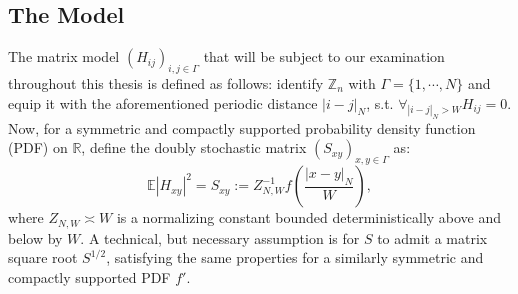\documentclass[11pt]{article}
\newcommand{\Z}{\mathbb{Z}}
\begin{document}
\subsection*{The Model}
\label{model}
The matrix model $(H_{ij})_{i, j\in \Gamma}$ that will be subject to our examination throughout this thesis is defined as follows: identify $\Z_n$ with $\Gamma=\{1, \cdots, N\}$ and equip it with the aforementioned periodic distance $|i-j|_N$, s.t. $\forall_{|i-j|_N>W} H_{ij}=0$. Now, for a symmetric and compactly supported probability density function (PDF) on $\mathbb{R}$, define the doubly stochastic matrix $(S_{xy})_{x, y\in \Gamma}$ as: $$\mathbb{E}|H_{xy}|^2=S_{xy} := Z_{N, W}^{-1}f\left(\frac{|x-y|_N}{W}\right),$$
where $Z_{N, W}\asymp W$ is a normalizing constant bounded deterministically above and below by $W$. A technical, but necessary assumption is for $S$ to admit a matrix square root $S^{1/2}$, satisfying the same properties for a similarly symmetric and compactly supported PDF $f'$. \vspace{0.75 cm}
\begin{center}
\end{center}
\vspace{0.255 cm}
\end{document}
